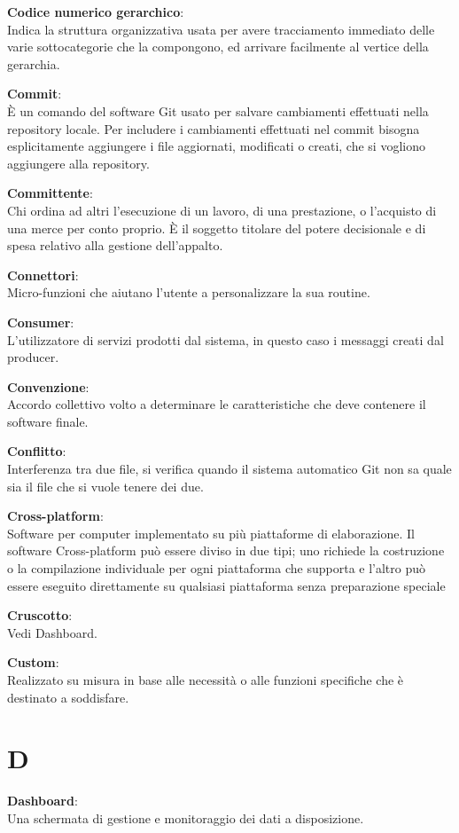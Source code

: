 \documentclass[a4paper, oneside, openany, dvipsnames, table]{article}
\begin{document}
\textbf{Codice numerico gerarchico}:\\  Indica la struttura organizzativa usata per avere tracciamento immediato delle varie sottocategorie che la compongono, ed  arrivare  facilmente al vertice della gerarchia.

\textbf{Commit}:\\ È un comando del software Git usato per salvare cambiamenti effettuati nella repository locale. Per includere i cambiamenti effettuati nel commit bisogna esplicitamente aggiungere i file aggiornati, modificati o creati, che si vogliono aggiungere alla repository.


\textbf{Committente}:\\	Chi ordina ad altri l’esecuzione di un lavoro, di una prestazione, o l’acquisto di una merce per conto proprio. È il soggetto titolare del potere decisionale e di spesa relativo alla gestione dell'appalto.

\textbf{Connettori}:\\ Micro-funzioni che aiutano l'utente a personalizzare la sua routine.

\textbf{Consumer}:\\ L'utilizzatore di servizi prodotti dal sistema, in questo caso i messaggi creati dal producer.

\textbf{Convenzione}:\\	Accordo collettivo volto a determinare le caratteristiche che deve contenere il software finale.

\textbf{Conflitto}:\\	Interferenza tra due file, si verifica quando il sistema automatico Git non sa quale sia il file che si vuole tenere dei due.

\textbf{Cross-platform}:\\	 Software per computer implementato su più piattaforme di elaborazione. Il software Cross-platform può essere diviso in due tipi; uno richiede la costruzione o la compilazione individuale per ogni piattaforma che supporta e l'altro può essere eseguito direttamente su qualsiasi piattaforma senza preparazione speciale

\textbf{Cruscotto}:\\ Vedi Dashboard.

\textbf{Custom}:\\	Realizzato su misura in base alle necessità o alle funzioni specifiche che è destinato a soddisfare.	


\newpage
\section{D}
\textbf{Dashboard}:	\\ Una schermata di gestione e monitoraggio dei dati a disposizione.
\end{document}
